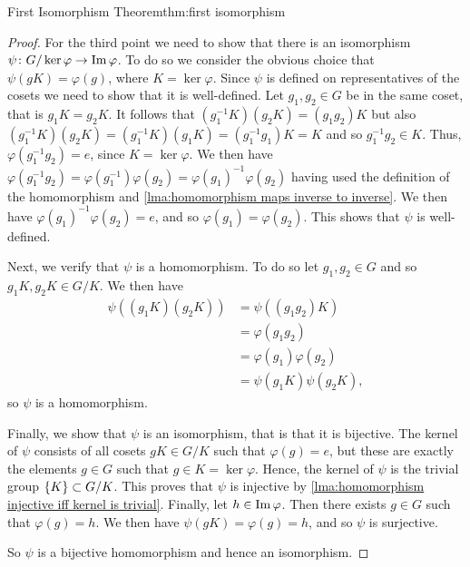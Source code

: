 \begin{thm}{First Isomorphism Theorem}{thm:first isomorphism}
\begin{proof}
        For the third point we need to show that there is an isomorphism \(\psi\colon G/\ker\varphi \to \operatorname{Im} \varphi\).
        To do so we consider the obvious choice that \(\psi(gK) = \varphi(g)\), where \(K = \ker\varphi\).
        Since \(\psi\) is defined on representatives of the cosets we need to show that it is well-defined.
        Let \(g_1, g_2 \in G\) be in the same coset, that is \(g_1K = g_2K\).
        It follows that \((g_1^{-1}K)(g_2K) = (g_1g_2)K\) but also \((g_1^{-1}K)(g_2K) = (g_1^{-1}K)(g_1K) = (g_1^{-1}g_1)K = K\) and so \(g_1^{-1}g_2 \in K\).
        Thus, \(\varphi(g_1^{-1}g_2) = e\), since \(K = \ker\varphi\).
        We then have \(\varphi(g_1^{-1}g_2) = \varphi(g_1^{-1})\varphi(g_2) = \varphi(g_1)^{-1}\varphi(g_2)\) having used the definition of the homomorphism and \cref{lma:homomorphism maps inverse to inverse}.
        We then have \(\varphi(g_1)^{-1}\varphi(g_2) = e\), and so \(\varphi(g_1) = \varphi(g_2)\).
        This shows that \(\psi\) is well-defined.
        
        Next, we verify that \(\psi\) is a homomorphism.
        To do so let \(g_1, g_2 \in G\) and so \(g_1K, g_2K \in G/K\).
        We then have
        \begin{align}
            \psi((g_1K)(g_2K)) &= \psi((g_1g_2)K)\\
            &= \varphi(g_1g_2)\\
            &= \varphi(g_1)\varphi(g_2)\\
            &= \psi(g_1K)\psi(g_2K),
        \end{align}
        so \(\psi\) is a homomorphism.
        
        Finally, we show that \(\psi\) is an isomorphism, that is that it is bijective.
        The kernel of \(\psi\) consists of all cosets \(gK \in G/K\) such that \(\varphi(g) = e\), but these are exactly the elements \(g \in G\) such that \(g \in K = \ker\varphi\).
        Hence, the kernel of \(\psi\) is the trivial group \(\{K\} \subset G/K\).
        This proves that \(\psi\) is injective by \cref{lma:homomorphism injective iff kernel is trivial}.
        Finally, let \(h \in \operatorname{Im} \varphi\).
        Then there exists \(g \in G\) such that \(\varphi(g) = h\).
        We then have \(\psi(gK) = \varphi(g) = h\), and so \(\psi\) is surjective.
        
        So \(\psi\) is a bijective homomorphism and hence an isomorphism.
    \end{proof}
\end{thm}

